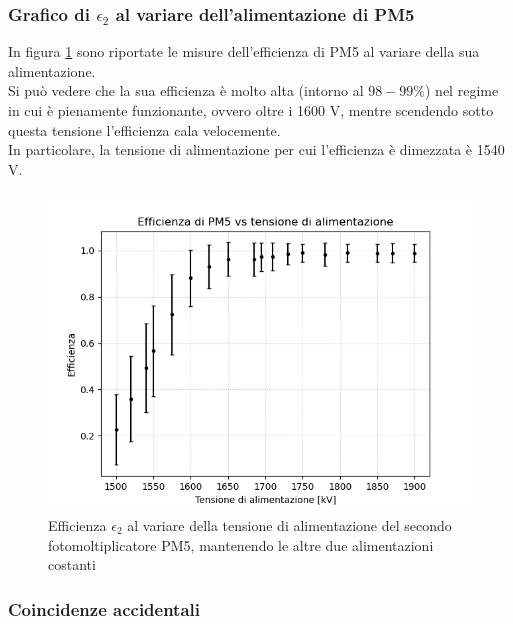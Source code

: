 \documentclass{article}
\begin{document}
\newpage

\subsubsection{Grafico di $\epsilon_2$ al variare dell'alimentazione di PM5}
In figura \ref{fepsilon2} sono riportate le misure dell'efficienza di PM5 al variare della sua alimentazione. 
\\
Si può vedere che la sua efficienza è molto alta (intorno al $98-99\%$) nel regime in cui è pienamente funzionante, ovvero oltre i 1600 V, mentre scendendo sotto questa tensione l'efficienza cala velocemente. \\
In particolare, la tensione di alimentazione per cui l'efficienza è dimezzata è 1540 V.

\begin{figure}[h!]
\begin{center}
\includegraphics[scale=0.7]{Grafici/epsilon_vs_alimentazione_PM5.png}
\caption{Efficienza $\epsilon_2$ al variare della tensione di alimentazione del secondo fotomoltiplicatore PM5, mantenendo le altre due alimentazioni costanti} \label{fepsilon2}
\end{center}
\end{figure}

\subsubsection{Coincidenze accidentali}
\end{document}
